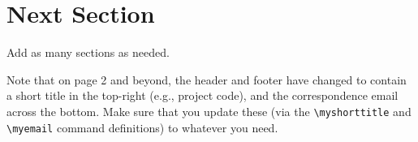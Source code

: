 \documentclass[12pt]{article}
\newcommand{\myshorttitle}{Short title for report, e.g., AAGI/GRDC Project code}
\begin{document}
  \section{Next Section}
  
  Add as many sections as needed.
  
  Note that on page 2 and beyond, the header and footer have changed to contain
  a short title in the top-right (e.g., project code), and the correspondence
  email across the bottom. Make sure that you update these (via the
  \verb|\myshorttitle| and \verb|\myemail| command definitions) to whatever
  you need.  
  
  
    
  
\end{document}
